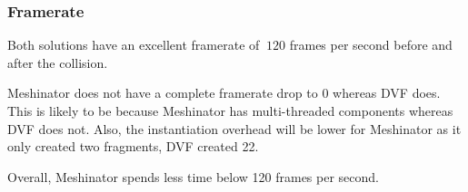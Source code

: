\clearpage
\subsubsection{Framerate}

Both solutions have an excellent framerate of $~120$ frames per second before and after the collision.

Meshinator does not have a complete framerate drop to 0 whereas DVF does. This is likely to be because Meshinator has multi-threaded components whereas DVF does not. Also, the instantiation overhead will be lower for Meshinator as it only created two fragments, DVF created 22.

Overall, Meshinator spends less time below 120 frames per second.

\FloatBarrier

